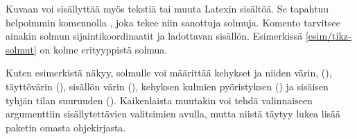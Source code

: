 \begin{esimerkki*}

\begin{koodilohko}
\end{koodilohko}

  \begin{tulos}
  \end{tulos}

  \caption{Solmuja tehdään \-/ komennolla}
  \label{esim/tikz-solmut}
\end{esimerkki*}

Kuvaan voi sisällyttää myös tekstiä tai muuta Latexin sisältöä. Se
tapahtuu helpoimmin komennolla , joka tekee niin sanottuja
solmuja. Komento tarvitsee ainakin solmun sijaintikoordinaatit ja
ladottavan sisällön. Esimerkissä \ref{esim/tikz-solmut} on kolme
erityyppistä solmua.

Kuten esimerkistä näkyy, solmulle voi määrittää kehykset ja niiden
värin, (), täyttövärin (), sisällön värin
(), kehyksen kulmien pyöristyksen () ja sisäisen tyhjän tilan suuruuden ().
Kaikenlaista muutakin voi tehdä valinnaiseen argumenttiin
sisällytettävien valitsimien avulla, mutta niistä täytyy lukea lisää
paketin omasta ohjekirjasta.

